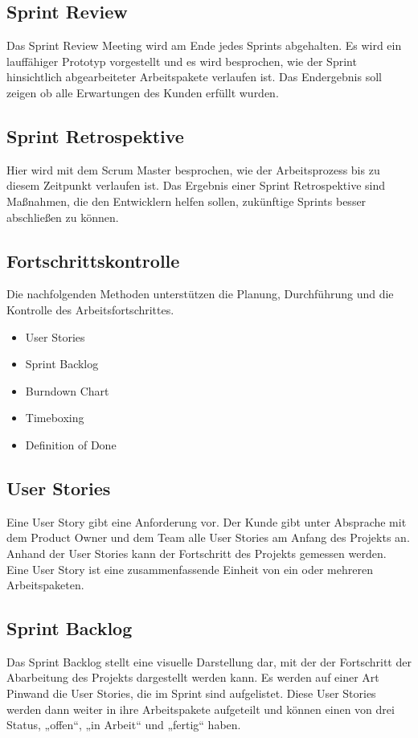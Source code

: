 \subsection{Sprint Review}
Das Sprint Review Meeting wird am Ende jedes Sprints abgehalten. Es wird ein lauffähiger Prototyp vorgestellt und es wird besprochen, wie der Sprint hinsichtlich abgearbeiteter Arbeitspakete verlaufen ist. Das Endergebnis soll zeigen ob alle Erwartungen des Kunden erfüllt wurden.
\subsection{Sprint Retrospektive}
Hier wird mit dem Scrum Master besprochen, wie der Arbeitsprozess bis zu diesem Zeitpunkt verlaufen ist. Das Ergebnis einer Sprint Retrospektive sind Maßnahmen, die den Entwicklern helfen sollen, zukünftige Sprints besser abschließen zu können.
\subsection{Fortschrittskontrolle}
Die nachfolgenden Methoden unterstützen die Planung, Durchführung und die Kontrolle des Arbeitsfortschrittes. 
\begin{itemize}
	\item	User Stories
	\item	Sprint Backlog
	\item	Burndown Chart
	\item	Timeboxing
	\item	Definition of Done
\end{itemize}
\subsection{User Stories}
Eine User Story gibt eine Anforderung vor. Der Kunde gibt unter Absprache mit dem Product Owner und dem Team alle User Stories am Anfang des Projekts an.
Anhand der User Stories kann der Fortschritt des Projekts gemessen werden.
Eine User Story ist eine zusammenfassende Einheit von ein oder mehreren Arbeitspaketen.
\subsection{Sprint Backlog}
Das Sprint Backlog stellt eine visuelle Darstellung dar, mit der der Fortschritt der Abarbeitung des Projekts dargestellt werden kann. Es werden auf einer Art Pinwand die User Stories, die im Sprint sind aufgelistet. Diese User Stories werden dann weiter in ihre Arbeitspakete aufgeteilt und können einen von drei Status, „offen“, „in Arbeit“ und „fertig“ haben.
